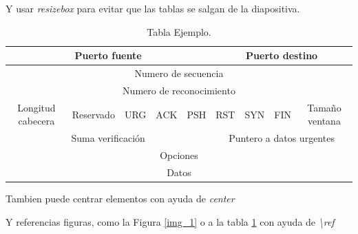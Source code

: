 \documentclass{beamer}
\begin{document}
Y usar \emph{resizebox} para evitar que las tablas se salgan de la diapositiva.

\begin{table}
	\centering
	\resizebox{10cm}{!} {
	\begin{tabular}{|c|c|c|c|c|c|c|c|c|}
	\hline
	\multicolumn{5}{|c|}{Puerto fuente} & \multicolumn{4}{|c|}{Puerto destino} \\ \hline
	\multicolumn{9}{|c|}{Numero de secuencia} \\ \hline
	\multicolumn{9}{|c|}{Numero de reconocimiento} \\ \hline
	Longitud cabecera & Reservado & URG & ACK & PSH & RST & SYN & FIN & Tamaño ventana \\ \hline
	\multicolumn{5}{|c|}{Suma verificación} & \multicolumn{4}{|c|}{Puntero a datos urgentes} \\ \hline
	\multicolumn{9}{|c|}{Opciones} \\ \hline
	\multicolumn{9}{|c|}{Datos} \\ \hline
	\end{tabular}
	}
	\caption{Tabla Ejemplo.}
	\label{c2_tabla_segento_tcp}
	\end{table}

\begin{frame}
	\begin{center}
		Tambien puede centrar elementos con ayuda de \emph{center}
	\end{center}	
\end{frame}

\begin{frame}
	Y referencias figuras, como la Figura \ref{img_1} o a la tabla \ref{c2_tabla_segento_tcp} con ayuda de  \emph{\textbackslash ref}
\end{frame}
\end{document}
